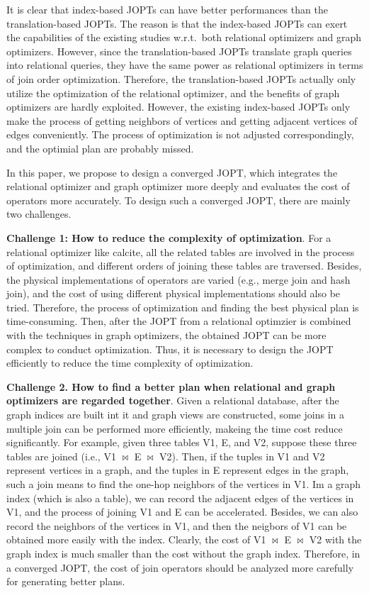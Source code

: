 \documentclass[sigconf, nonacm]{acmart}
\begin{document}
It is clear that index-based JOPTs can have better performances than the translation-based JOPTs.
The reason is that the index-based JOPTs can exert the capabilities of the existing studies w.r.t.~both relational optimizers and graph optimizers.
However, since the translation-based JOPTs translate graph queries into relational queries, they have the same power as relational optimizers in terms of join order optimization.
Therefore, the translation-based JOPTs actually only utilize the optimization of the relational optimizer, and the benefits of graph optimizers are hardly exploited.
However, the existing index-based JOPTs only make the process of getting neighbors of vertices and getting adjacent vertices of edges conveniently.
The process of optimization is not adjusted correspondingly, and the optimial plan are probably missed.

In this paper, we propose to design a converged JOPT, which integrates the relational optimizer and graph optimizer more deeply and evaluates the cost of operators more accurately. 
To design such a converged JOPT, there are mainly two challenges.

\textbf{Challenge 1: How to reduce the complexity of optimization}. 
For a relational optimizer like calcite, all the related tables are involved in the process of optimization, and different orders of joining these tables are traversed.
Besides, the physical implementations of operators are varied (e.g., merge join and hash join), and the cost of using different physical implementations should also be tried.
Therefore, the process of optimization and finding the best physical plan is time-consuming.
Then, after the JOPT from a relational optimzier is combined with the techniques in graph optimizers, the obtained JOPT can be more complex to conduct optimization.
Thus, it is necessary to design the JOPT efficiently to reduce the time complexity of optimization.


\textbf{Challenge 2. How to find a better plan when relational and graph optimizers are regarded together}.
Given a relational database, after the graph indices are built int it and graph views are constructed, some joins in a multiple join can be performed more efficiently, makeing the time cost reduce significantly.
For example, given three tables V1, E, and V2, suppose these three tables are joined (i.e., V1 $\bowtie$ E $\bowtie$ V2).
Then, if the tuples in V1 and V2 represent vertices in a graph, and the tuples in E represent edges in the graph, such a join means to find the one-hop neighbors of the vertices in V1.
Im a graph index (which is also a table), we can record the adjacent edges of the vertices in V1, and the process of joining V1 and E can be accelerated.
Besides, we can also record the neighbors of the vertices in V1, and then the neigbors of V1 can be obtained more easily with the index.
Clearly, the cost of V1 $\bowtie$ E $\bowtie$ V2 with the graph index is much smaller than the cost without the graph index.
Therefore, in a converged JOPT, the cost of join operators should be analyzed more carefully for generating better plans.
\end{document}

